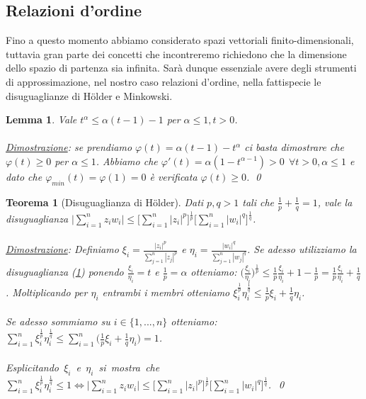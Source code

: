 \documentclass[a4paper,12pt]{report}
\newtheorem{teorema}{Teorema}[chapter]
\newtheorem{lemma}{Lemma}[chapter]
\newcommand{\gt}{>}
\begin{document}
\subsection{Relazioni d'ordine}

Fino a questo momento abbiamo considerato spazi vettoriali finito-dimensionali, tuttavia gran parte dei concetti che incontreremo richiedono che la dimensione dello spazio di partenza sia infinita. Sarà dunque essenziale avere degli strumenti di approssimazione, nel nostro caso relazioni d'ordine, nella fattispecie le disuguaglianze di  Hölder e Minkowski. 

\begin{lemma}\label{lem: 2.1}
    Vale $t^{\alpha} \leq \alpha (t-1)-1$ per $\alpha \leq1, t \gt0$.
    \\
    \\ \underline{Dimostrazione}: se prendiamo $\varphi(t)=\alpha (t-1)-t^{\alpha}$ ci basta dimostrare che $\varphi(t)\geq0$ per $\alpha \leq1$. Abbiamo che $\varphi '(t)=\alpha(1-t^{\alpha -1})\gt 0 \ \ \forall t \gt 0, \alpha \leq 1$ e dato che $\varphi_{min}(t)=\varphi(1)=0$ è verificata $\varphi (t) \geq0$. \qed
\end{lemma}

\newpage

\begin{teorema}[Disuguaglianza di Hölder]\label{thm: 2.2}
    Dati $p,q \gt 1$ tali che $\displaystyle\frac{1}{p}+\frac{1}{q}=1$, vale la disuguaglianza $\displaystyle \Bigg|\sum_{i=1}^nz_iw_i\Bigg| \leq\bigg[\sum_{i=1}^n|z_i|^p\bigg]^{\frac{1}{p}}\bigg[\sum_{i=1}^n|w_i|^q\bigg]^{\frac{1}{q}}$.
    \\
    \\ \underline{Dimostrazione}: Definiamo $\xi_i=\displaystyle\frac{|z_i|^p}{\sum_{j=1}^n|z_j|^p}$ e $\eta_i=\displaystyle\frac{|w_i|^q}{\sum_{j=1}^n|w_j|^q}$. Se adesso utilizziamo la disuguaglianza (\ref{lem: 2.1}) ponendo $\displaystyle\frac{\xi_i}{\eta_i}=t$ e $\displaystyle\frac{1}{p}=\alpha$ otteniamo: $\displaystyle\bigg(\frac{\xi_i}{\eta_i}\bigg)^{\frac{1}{p}}\leq\displaystyle\frac{1}{p}\frac{\xi_i}{\eta_i}+1-\frac{1}{p}=\displaystyle\frac{1}{p}\frac{\xi_i}{\eta_i}+\frac{1}{q}$. Moltiplicando per $\eta_i$ entrambi i membri otteniamo $\xi_i^{\frac{1}{p}}\eta_i^{\frac{1}{q}}\leq\displaystyle\frac{1}{p}\xi_i+\frac{1}{q}\eta_i$. 
    \\
    \\Se adesso sommiamo su $i\in \{1,...,n\}$ otteniamo: $\displaystyle\sum_{i=1}^n\xi_i^{\frac{1}{p}}\eta_i^{\frac{1}{q}}\leq\sum_{i=1}^n\bigg(\frac{1}{p}\xi_i+\frac{1}{q}\eta_i\bigg)=1$. 
    \\
    \\ \mbox{Esplicitando $\xi_i$ e $\eta_i$ si mostra che $\displaystyle\sum_{i=1}^n\xi_i^{\frac{1}{p}}\eta_i^{\frac{1}{q}}\leq 1 \iff \displaystyle \Bigg|\sum_{i=1}^nz_iw_i\Bigg| \leq\bigg[\sum_{i=1}^n|z_i|^p\bigg]^{\frac{1}{p}}\bigg[\sum_{i=1}^n|w_i|^q\bigg]^{\frac{1}{q}}$. \qed}
\end{teorema}
\end{document}
